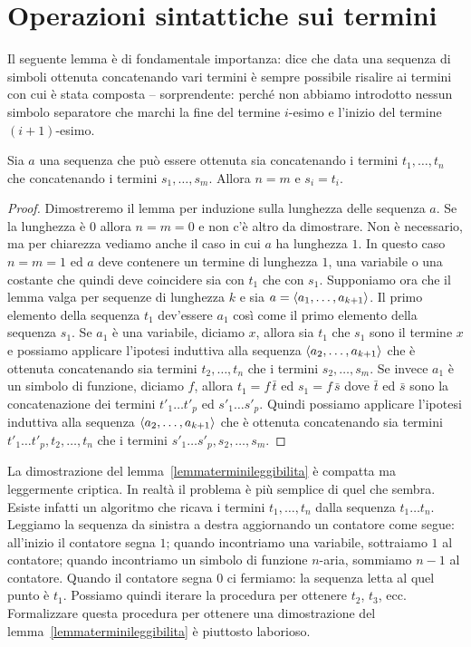 \section{Operazioni sintattiche sui termini}

Il seguente lemma \`e di fondamentale importanza: dice che data una sequenza di simboli ottenuta concatenando vari termini \`e sempre possibile risalire ai termini con cui \`e stata composta -- sorprendente: perch\'e non abbiamo introdotto nessun simbolo separatore che marchi la fine del termine $i$-esimo e l'inizio del termine $(i+1)$-esimo.

\begin{lemma}\label{lemmaterminileggibilita}
Sia $a$ una sequenza che pu\`o essere ottenuta sia concatenando i termini $t_1,\dots,t_n$ che concatenando i termini $s_1,\dots,s_m$. Allora $n=m$ e $s_i=t_i$.
\end{lemma}
\begin{proof}
Dimostreremo il lemma per induzione sulla lunghezza delle sequenza $a$. Se la lunghezza \`e $0$ allora $n=m=0$ e non c'\`e altro da dimostrare. Non \`e necessario, ma per chiarezza vediamo anche il caso in cui $a$ ha lunghezza $1$.  In questo caso $n=m=1$ ed $a$ deve contenere un termine di lunghezza $1$, una variabile o una costante che quindi deve coincidere sia con $t_1$ che con $s_1$. Supponiamo ora che il lemma valga per sequenze di lunghezza $k$ e sia $a=\langle a_1,\dots,a_{k+1}\rangle$. Il primo elemento della sequenza $t_1$  dev'essere $a_1$ cos\`i come il primo elemento della sequenza $s_1$. Se $a_1$ \`e una variabile, diciamo $x$, allora sia $t_1$ che $s_1$ sono il termine $x$ e possiamo applicare l'ipotesi induttiva alla sequenza $\langle a_2,\dots,a_{k+1}\rangle$ che \`e ottenuta concatenando sia termini $t_2,\dots,t_n$ che i termini $s_2,\dots,s_m$. Se invece $a_1$ \`e un simbolo di funzione, diciamo $f$, allora $t_1=f\,\bar t$ ed $s_1=f\,\bar s$ dove $\bar t$ ed $\bar s$ sono la concatenazione dei termini $t'_1 \dots t'_p$ ed $s'_1 \dots s'_p$.  Quindi possiamo applicare l'ipotesi induttiva alla sequenza $\langle a_2,\dots,a_{k+1}\rangle$ che \`e ottenuta concatenando sia termini $t'_1 \dots t'_p,t_2,\dots,t_n$ che i termini $s'_1 \dots s'_p,s_2,\dots,s_m$.
\end{proof}

La dimostrazione del lemma~\ref{lemmaterminileggibilita} \`e compatta ma leggermente criptica. In realt\`a il problema \`e pi\`u semplice di quel che sembra. Esiste infatti un algoritmo che ricava i termini $t_1, \dots, t_n$ dalla sequenza $t_1 \dots t_n$. Leggiamo la sequenza da sinistra a destra aggiornando un contatore come segue: all'inizio il contatore segna $1$; quando incontriamo una variabile, sottraiamo $1$ al contatore; quando incontriamo un simbolo di funzione $n$-aria, sommiamo $n-1$ al contatore. Quando il contatore segna $0$ ci fermiamo: la sequenza letta al quel punto \`e $t_1$. Possiamo quindi iterare la procedura per ottenere $t_2$, $t_3$, ecc. Formalizzare questa procedura per ottenere una dimostrazione del lemma~\ref{lemmaterminileggibilita} \`e piuttosto laborioso.

